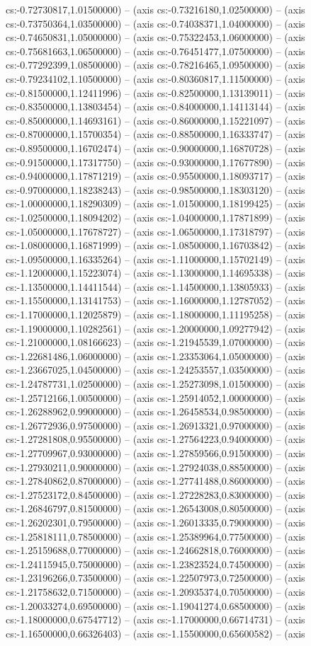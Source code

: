 cs:-0.72730817,1.01500000) -- (axis cs:-0.73216180,1.02500000) -- (axis cs:-0.73750364,1.03500000) -- (axis cs:-0.74038371,1.04000000) -- (axis cs:-0.74650831,1.05000000) -- (axis cs:-0.75322453,1.06000000) -- (axis cs:-0.75681663,1.06500000) -- (axis cs:-0.76451477,1.07500000) -- (axis cs:-0.77292399,1.08500000) -- (axis cs:-0.78216465,1.09500000) -- (axis cs:-0.79234102,1.10500000) -- (axis cs:-0.80360817,1.11500000) -- (axis cs:-0.81500000,1.12411996) -- (axis cs:-0.82500000,1.13139011) -- (axis cs:-0.83500000,1.13803454) -- (axis cs:-0.84000000,1.14113144) -- (axis cs:-0.85000000,1.14693161) -- (axis cs:-0.86000000,1.15221097) -- (axis cs:-0.87000000,1.15700354) -- (axis cs:-0.88500000,1.16333747) -- (axis cs:-0.89500000,1.16702474) -- (axis cs:-0.90000000,1.16870728) -- (axis cs:-0.91500000,1.17317750) -- (axis cs:-0.93000000,1.17677890) -- (axis cs:-0.94000000,1.17871219) -- (axis cs:-0.95500000,1.18093717) -- (axis cs:-0.97000000,1.18238243) -- (axis cs:-0.98500000,1.18303120) -- (axis cs:-1.00000000,1.18290309) -- (axis cs:-1.01500000,1.18199425) -- (axis cs:-1.02500000,1.18094202) -- (axis cs:-1.04000000,1.17871899) -- (axis cs:-1.05000000,1.17678727) -- (axis cs:-1.06500000,1.17318797) -- (axis cs:-1.08000000,1.16871999) -- (axis cs:-1.08500000,1.16703842) -- (axis cs:-1.09500000,1.16335264) -- (axis cs:-1.11000000,1.15702149) -- (axis cs:-1.12000000,1.15223074) -- (axis cs:-1.13000000,1.14695338) -- (axis cs:-1.13500000,1.14411544) -- (axis cs:-1.14500000,1.13805933) -- (axis cs:-1.15500000,1.13141753) -- (axis cs:-1.16000000,1.12787052) -- (axis cs:-1.17000000,1.12025879) -- (axis cs:-1.18000000,1.11195258) -- (axis cs:-1.19000000,1.10282561) -- (axis cs:-1.20000000,1.09277942) -- (axis cs:-1.21000000,1.08166623) -- (axis cs:-1.21945539,1.07000000) -- (axis cs:-1.22681486,1.06000000) -- (axis cs:-1.23353064,1.05000000) -- (axis cs:-1.23667025,1.04500000) -- (axis cs:-1.24253557,1.03500000) -- (axis cs:-1.24787731,1.02500000) -- (axis cs:-1.25273098,1.01500000) -- (axis cs:-1.25712166,1.00500000) -- (axis cs:-1.25914052,1.00000000) -- (axis cs:-1.26288962,0.99000000) -- (axis cs:-1.26458534,0.98500000) -- (axis cs:-1.26772936,0.97500000) -- (axis cs:-1.26913321,0.97000000) -- (axis cs:-1.27281808,0.95500000) -- (axis cs:-1.27564223,0.94000000) -- (axis cs:-1.27709967,0.93000000) -- (axis cs:-1.27859566,0.91500000) -- (axis cs:-1.27930211,0.90000000) -- (axis cs:-1.27924038,0.88500000) -- (axis cs:-1.27840862,0.87000000) -- (axis cs:-1.27741488,0.86000000) -- (axis cs:-1.27523172,0.84500000) -- (axis cs:-1.27228283,0.83000000) -- (axis cs:-1.26846797,0.81500000) -- (axis cs:-1.26543008,0.80500000) -- (axis cs:-1.26202301,0.79500000) -- (axis cs:-1.26013335,0.79000000) -- (axis cs:-1.25818111,0.78500000) -- (axis cs:-1.25389964,0.77500000) -- (axis cs:-1.25159688,0.77000000) -- (axis cs:-1.24662818,0.76000000) -- (axis cs:-1.24115945,0.75000000) -- (axis cs:-1.23823524,0.74500000) -- (axis cs:-1.23196266,0.73500000) -- (axis cs:-1.22507973,0.72500000) -- (axis cs:-1.21758632,0.71500000) -- (axis cs:-1.20935374,0.70500000) -- (axis cs:-1.20033274,0.69500000) -- (axis cs:-1.19041274,0.68500000) -- (axis cs:-1.18000000,0.67547712) -- (axis cs:-1.17000000,0.66714731) -- (axis cs:-1.16500000,0.66326403) -- (axis cs:-1.15500000,0.65600582) -- (axis 